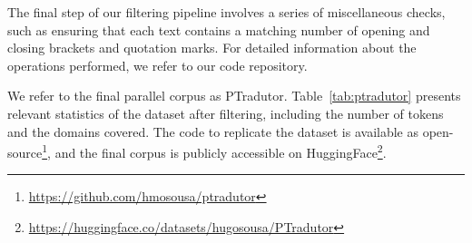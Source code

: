 The final step of our filtering pipeline involves a series of miscellaneous checks, such as ensuring that each text contains a matching number of opening and closing brackets and quotation marks. For detailed information about the operations performed, we refer to our code repository. 

We refer to the final parallel corpus as PTradutor. Table~\ref{tab:ptradutor} presents relevant statistics of the dataset after filtering, including the number of tokens and the domains covered. The code to replicate the dataset is available as open-source\footnote{\url{https://github.com/hmosousa/ptradutor}}, and the final corpus is publicly accessible on HuggingFace\footnote{\url{https://huggingface.co/datasets/hugosousa/PTradutor}}.


